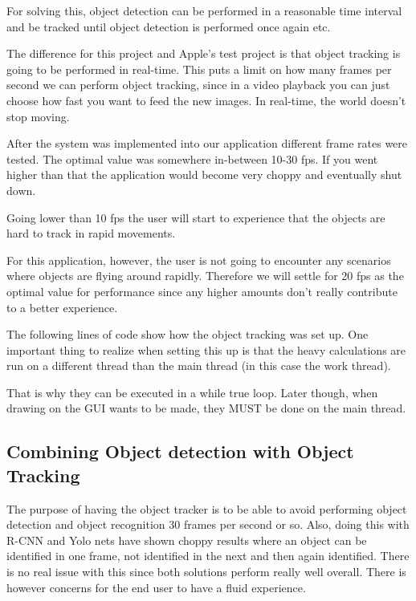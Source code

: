 For solving this, object detection can be performed in a reasonable time interval and be tracked until object detection is performed once again etc.

\cite{ObjectTracking}
The difference for this project and Apple's test project is that object tracking is going to be performed in real-time. This puts a limit on how many frames per second we can perform object tracking, since in a video playback you can just choose how fast you want to feed the new images. In real-time, the world doesn't stop moving.

After the system was implemented into our application different frame rates were tested. The optimal value was somewhere in-between 10-30 fps. If you went higher than that the application would become very choppy and eventually shut down.

Going lower than 10 fps the user will start to experience that the objects are hard to track in rapid movements.

For this application, however, the user is not going to encounter any scenarios where objects are flying around rapidly. Therefore we will settle for 20 fps as the optimal value for performance since any higher amounts don't really contribute to a better experience.

The following lines of code show how the object tracking was set up. One important thing to realize when setting this up is that the heavy calculations are run on a different thread than the main thread (in this case the work thread). 

That is why they can be executed in a while true loop. Later though, when drawing on the GUI wants to be made, they MUST be done on the main thread.




\subsection{Combining Object detection with Object Tracking}
The purpose of having the object tracker is to be able to avoid performing object detection and object recognition 30 frames per second or so. Also, doing this with R-CNN and Yolo nets have shown choppy results where an object can be identified in one frame, not identified in the next and then again identified.
There is no real issue with this since both solutions perform really well overall. There is however concerns for the end user to have a fluid experience.

